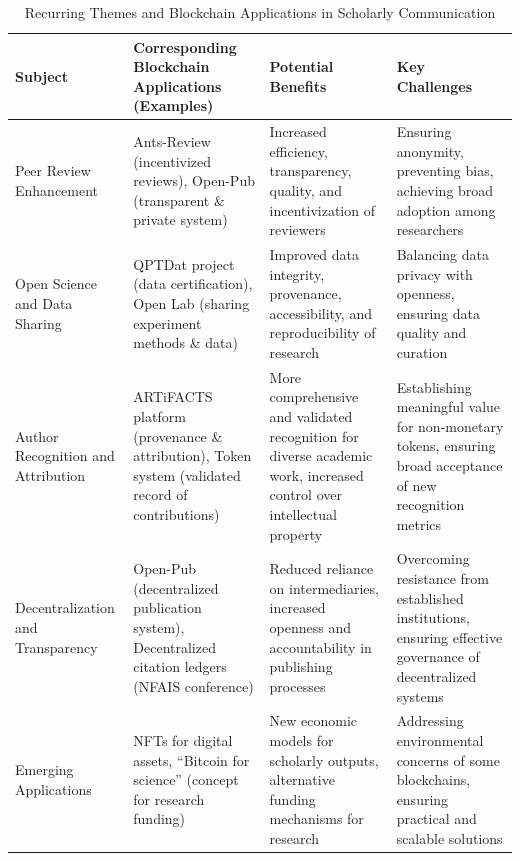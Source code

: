 \documentclass[final]{rc-book-2.14}
\begin{document}
\begin{table}[ht]
    \centering
    \caption{Recurring Themes and Blockchain Applications in Scholarly Communication}
    \label{tab:recurring-themes-blockchain}
    \begin{tabularx}{\textwidth}{|X|X|X|X|}
        \hline
        \textbf{Subject}                   & \textbf{Corresponding Blockchain Applications (Examples)}                                        & \textbf{Potential Benefits}                                                                                          & \textbf{Key Challenges}                                                                                     \\
        \hline
        Peer Review Enhancement            & Ants-Review (incentivized reviews), Open-Pub (transparent \& private system)                     & Increased efficiency, transparency, quality, and incentivization of reviewers                                        & Ensuring anonymity, preventing bias, achieving broad adoption among researchers                             \\
        \hline
        Open Science and Data Sharing      & QPTDat project (data certification), Open Lab (sharing experiment methods \& data)               & Improved data integrity, provenance, accessibility, and reproducibility of research                                  & Balancing data privacy with openness, ensuring data quality and curation                                    \\
        \hline
        Author Recognition and Attribution & ARTiFACTS platform (provenance \& attribution), Token system (validated record of contributions) & More comprehensive and validated recognition for diverse academic work, increased control over intellectual property & Establishing meaningful value for non-monetary tokens, ensuring broad acceptance of new recognition metrics \\
        \hline
        Decentralization and Transparency  & Open-Pub (decentralized publication system), Decentralized citation ledgers (NFAIS conference)   & Reduced reliance on intermediaries, increased openness and accountability in publishing processes                    & Overcoming resistance from established institutions, ensuring effective governance of decentralized systems \\
        \hline
        Emerging Applications              & NFTs for digital assets, ``Bitcoin for science'' (concept for research funding)                  & New economic models for scholarly outputs, alternative funding mechanisms for research                               & Addressing environmental concerns of some blockchains, ensuring practical and scalable solutions            \\
        \hline
    \end{tabularx}
\end{table}
\end{document}
